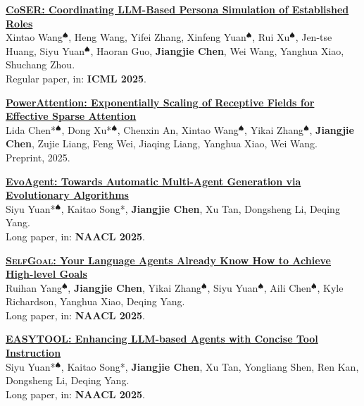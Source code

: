 \documentclass{resume}
\begin{document}
\begin{enumerate}[label={[\arabic*]}]
  \item \textbf{\href{https://jiangjiechen.github.io/publication/coser}{CoSER: Coordinating LLM-Based Persona Simulation of Established Roles}}\\
  \label{paper:coser}
  Xintao Wang$^\spadesuit$, Heng Wang, Yifei Zhang, Xinfeng Yuan$^\spadesuit$, Rui Xu$^\spadesuit$, Jen-tse Huang, Siyu Yuan$^\spadesuit$, Haoran Guo, \textbf{Jiangjie Chen}, Wei Wang, Yanghua Xiao, Shuchang Zhou.\\
  Regular paper, in: \textbf{ICML 2025}.

  \item \textbf{\href{https://jiangjiechen.github.io/publication/powerattention}{PowerAttention: Exponentially Scaling of Receptive Fields for Effective Sparse Attention}}\\
  \label{paper:powerattention}
  Lida Chen*$^\spadesuit$, Dong Xu*$^\spadesuit$, Chenxin An, Xintao Wang$^\spadesuit$, Yikai Zhang$^\spadesuit$, \textbf{Jiangjie Chen}, Zujie Liang, Feng Wei, Jiaqing Liang, Yanghua Xiao, Wei Wang.\\
  Preprint, 2025.

  \item \textbf{\href{https://jiangjiechen.github.io/publication/evoagent}{EvoAgent: Towards Automatic Multi-Agent Generation via Evolutionary Algorithms}}\\
  \label{paper:evoagent}
  Siyu Yuan*$^\spadesuit$, Kaitao Song*, \textbf{Jiangjie Chen}, Xu Tan, Dongsheng Li, Deqing Yang.\\
  Long paper, in: \textbf{NAACL 2025}.
  
  
  \item \textbf{\href{https://jiangjiechen.github.io/publication/selfgoal}{\textsc{SelfGoal}: Your Language Agents Already Know How to Achieve High-level Goals}}\\
  \label{paper:selfgoal}
  Ruihan Yang$^\spadesuit$, \textbf{Jiangjie Chen}, Yikai Zhang$^\spadesuit$, Siyu Yuan$^\spadesuit$, Aili Chen$^\spadesuit$, Kyle Richardson, Yanghua Xiao, Deqing Yang.\\
  Long paper, in: \textbf{NAACL 2025}.

  \item \textbf{\href{https://jiangjiechen.github.io/publication/easytool}{EASYTOOL: Enhancing LLM-based Agents with Concise Tool Instruction}}\\
  \label{paper:easytool}
  Siyu Yuan*$^\spadesuit$, Kaitao Song*, \textbf{Jiangjie Chen}, Xu Tan, Yongliang Shen, Ren Kan, Dongsheng Li, Deqing Yang.\\
  Long paper, in: \textbf{NAACL 2025}.
  

\end{enumerate}
\end{document}
